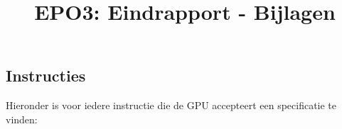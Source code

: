 \documentclass{scrartcl}
\author{}
\title{EPO3: Eindrapport - Bijlagen}
\begin{document}
\renewcommand{\chapternumber}{\appendixname\;\thechapter}
\begin{appendices}

\chapter{Instructies}
\label{app:instructies}
Hieronder is voor iedere instructie die de GPU accepteert een specificatie te vinden:

\end{appendices}
\end{document}
